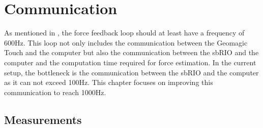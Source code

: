 \chapter{Communication}\label{cha:communication}

As mentioned in , the force feedback loop should at least have a frequency of 600Hz. This loop not only includes the communication between the Geomagic Touch and the computer but also the communication between the sbRIO and the computer and the computation time required for force estimation. In the current setup, the bottleneck is the communication between the sbRIO and the computer as it can not exceed 100Hz. This chapter focuses on improving this communication to reach 1000Hz.











\section{Measurements}



